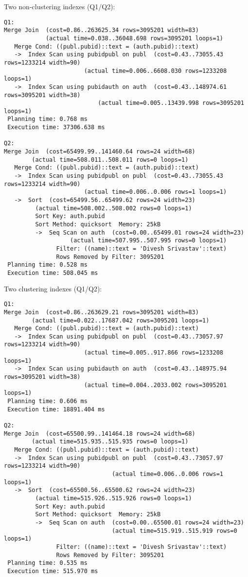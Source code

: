 \documentclass[11pt]{scrartcl}
\begin{document}
\noindent Two non-clustering indexes (Q1/Q2):
{\small
\begin{verbatim}
Q1:
Merge Join  (cost=0.86..263625.34 rows=3095201 width=83) 
            (actual time=0.038..36048.698 rows=3095201 loops=1)
   Merge Cond: ((publ.pubid)::text = (auth.pubid)::text)
   ->  Index Scan using pubidpubl on publ  (cost=0.43..73055.43 rows=1233214 width=90) 
					   (actual time=0.006..6608.030 rows=1233208 loops=1)
   ->  Index Scan using pubidauth on auth  (cost=0.43..148974.61 rows=3095201 width=38) 
				           (actual time=0.005..13439.998 rows=3095201 loops=1)
 Planning time: 0.768 ms
 Execution time: 37306.638 ms

Q2:
Merge Join  (cost=65499.99..141460.64 rows=24 width=68) 
	    (actual time=508.011..508.011 rows=0 loops=1)
   Merge Cond: ((publ.pubid)::text = (auth.pubid)::text)
   ->  Index Scan using pubidpubl on publ  (cost=0.43..73055.43 rows=1233214 width=90) 
					   (actual time=0.006..0.006 rows=1 loops=1)
   ->  Sort  (cost=65499.56..65499.62 rows=24 width=23) 
	     (actual time=508.002..508.002 rows=0 loops=1)
         Sort Key: auth.pubid
         Sort Method: quicksort  Memory: 25kB
         ->  Seq Scan on auth  (cost=0.00..65499.01 rows=24 width=23) 
			       (actual time=507.995..507.995 rows=0 loops=1)
               Filter: ((name)::text = 'Divesh Srivastav'::text)
               Rows Removed by Filter: 3095201
 Planning time: 0.528 ms
 Execution time: 508.045 ms
\end{verbatim}
}

\noindent Two clustering indexes  (Q1/Q2):
{\small
\begin{verbatim}
Q1:
Merge Join  (cost=0.86..263629.21 rows=3095201 width=83) 
	    (actual time=0.022..17687.042 rows=3095201 loops=1)
   Merge Cond: ((publ.pubid)::text = (auth.pubid)::text)
   ->  Index Scan using pubidpubl on publ  (cost=0.43..73057.97 rows=1233214 width=90) 
					   (actual time=0.005..917.866 rows=1233208 loops=1)
   ->  Index Scan using pubidauth on auth  (cost=0.43..148975.94 rows=3095201 width=38) 
					   (actual time=0.004..2033.002 rows=3095201 loops=1)
 Planning time: 0.606 ms
 Execution time: 18891.404 ms

Q2:
Merge Join  (cost=65500.99..141464.18 rows=24 width=68) 
	    (actual time=515.935..515.935 rows=0 loops=1)
   Merge Cond: ((publ.pubid)::text = (auth.pubid)::text)
   ->  Index Scan using pubidpubl on publ  (cost=0.43..73057.97 rows=1233214 width=90) 
    				           (actual time=0.006..0.006 rows=1 loops=1)
   ->  Sort  (cost=65500.56..65500.62 rows=24 width=23) 
	     (actual time=515.926..515.926 rows=0 loops=1)
         Sort Key: auth.pubid
         Sort Method: quicksort  Memory: 25kB
         ->  Seq Scan on auth  (cost=0.00..65500.01 rows=24 width=23) 
                               (actual time=515.919..515.919 rows=0 loops=1)
               Filter: ((name)::text = 'Divesh Srivastav'::text)
               Rows Removed by Filter: 3095201
 Planning time: 0.535 ms
 Execution time: 515.970 ms
\end{verbatim}
}
\end{document}

